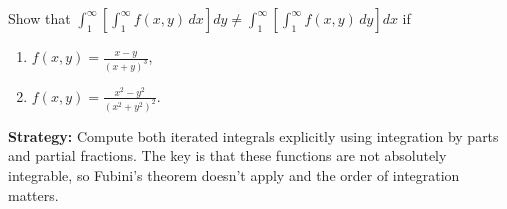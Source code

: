 \begin{problembox}
\begin{problemstatement}
Show that $\int_{1}^{\infty} \left[ \int_{1}^{\infty} f(x, y) \, dx \right] dy \neq \int_{1}^{\infty} \left[ \int_{1}^{\infty} f(x, y) \, dy \right] dx$ if
\begin{enumerate}[label=(\alph*)]
\item $f(x, y) = \frac{x - y}{(x + y)^3}$,
\item $f(x, y) = \frac{x^2 - y^2}{(x^2 + y^2)^2}.$
\end{enumerate}
\end{problemstatement}
\end{problembox}

\noindent\textbf{Strategy:} Compute both iterated integrals explicitly using integration by parts and partial fractions. The key is that these functions are not absolutely integrable, so Fubini's theorem doesn't apply and the order of integration matters.

